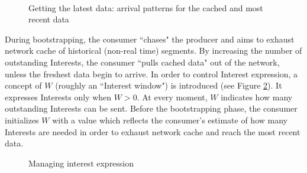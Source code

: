 \documentclass{icn/sig-alternate-2012} %
\begin{document}
\begin{figure}[t!]
\centering

\\

\caption{Getting the latest data: arrival patterns for the cached and most recent data}
\label{fig:inter-arrival}
\end{figure}

During bootstrapping, the consumer ``chases" the producer and aims to exhaust network cache of historical (non-real time) segments. By increasing the number of outstanding Interests, the consumer ``pulls cached data" out of the network, unless the freshest data begin to arrive. In order to control Interest expression, a concept of $W$ (roughly an ``Interest window") is introduced (see Figure \ref{fig:w-concept}). It expresses Interests only when $W > 0$. At every moment, $W$ indicates how many outstanding Interests can be sent. Before the bootstrapping phase, the consumer initializes $W$ with a value which reflects the consumer's estimate of how many Interests are needed in order to exhaust network cache and reach the most recent data. 

\begin{figure}[t!]
\centering


\caption{Managing interest expression}
\label{fig:w-concept}
\end{figure}
\end{document}
